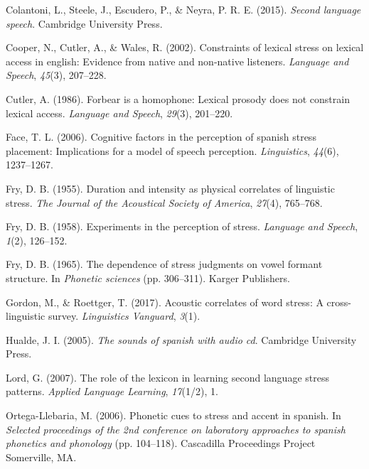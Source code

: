 \documentclass[english,man]{apa6}
\begin{document}
\leavevmode\hypertarget{ref-colantoni2015second}{}%
Colantoni, L., Steele, J., Escudero, P., \& Neyra, P. R. E. (2015). \emph{Second language speech}. Cambridge University Press.

\leavevmode\hypertarget{ref-cooper2002constraints}{}%
Cooper, N., Cutler, A., \& Wales, R. (2002). Constraints of lexical stress on lexical access in english: Evidence from native and non-native listeners. \emph{Language and Speech}, \emph{45}(3), 207--228.

\leavevmode\hypertarget{ref-cutler1986forbear}{}%
Cutler, A. (1986). Forbear is a homophone: Lexical prosody does not constrain lexical access. \emph{Language and Speech}, \emph{29}(3), 201--220.

\leavevmode\hypertarget{ref-face2006cognitive}{}%
Face, T. L. (2006). Cognitive factors in the perception of spanish stress placement: Implications for a model of speech perception. \emph{Linguistics}, \emph{44}(6), 1237--1267.

\leavevmode\hypertarget{ref-fry1955duration}{}%
Fry, D. B. (1955). Duration and intensity as physical correlates of linguistic stress. \emph{The Journal of the Acoustical Society of America}, \emph{27}(4), 765--768.

\leavevmode\hypertarget{ref-fry1958experiments}{}%
Fry, D. B. (1958). Experiments in the perception of stress. \emph{Language and Speech}, \emph{1}(2), 126--152.

\leavevmode\hypertarget{ref-fry1965dependence}{}%
Fry, D. B. (1965). The dependence of stress judgments on vowel formant structure. In \emph{Phonetic sciences} (pp. 306--311). Karger Publishers.

\leavevmode\hypertarget{ref-gordon2017acoustic}{}%
Gordon, M., \& Roettger, T. (2017). Acoustic correlates of word stress: A cross-linguistic survey. \emph{Linguistics Vanguard}, \emph{3}(1).

\leavevmode\hypertarget{ref-hualde2005sounds}{}%
Hualde, J. I. (2005). \emph{The sounds of spanish with audio cd}. Cambridge University Press.

\leavevmode\hypertarget{ref-lord2007role}{}%
Lord, G. (2007). The role of the lexicon in learning second language stress patterns. \emph{Applied Language Learning}, \emph{17}(1/2), 1.

\leavevmode\hypertarget{ref-ortega2006phonetic}{}%
Ortega-Llebaria, M. (2006). Phonetic cues to stress and accent in spanish. In \emph{Selected proceedings of the 2nd conference on laboratory approaches to spanish phonetics and phonology} (pp. 104--118). Cascadilla Proceedings Project Somerville, MA.
\end{document}
